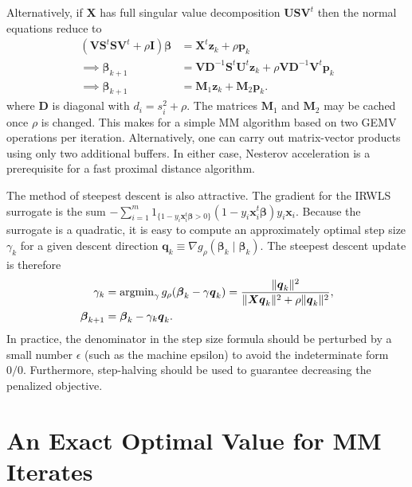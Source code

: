 \documentclass[11pt]{article}
\def\argmin{\mathop{\rm argmin}\nolimits}
\newcommand{\bp}{\boldsymbol{p}}
\newcommand{\bq}{\boldsymbol{q}}
\newcommand{\bx}{\boldsymbol{x}}
\newcommand{\bz}{\boldsymbol{z}}
\newcommand{\bD}{\boldsymbol{D}}
\newcommand{\bI}{\boldsymbol{I}}
\newcommand{\bM}{\boldsymbol{M}}
\newcommand{\bS}{\boldsymbol{S}}
\newcommand{\bU}{\boldsymbol{U}}
\newcommand{\bV}{\boldsymbol{V}}
\newcommand{\bX}{\boldsymbol{X}}
\newcommand{\bbeta}{\boldsymbol{\beta}}
\begin{document}
Alternatively, if $\bX$ has full singular value decomposition $\bU \bS \bV^{t}$ then the normal equations reduce to
\begin{equation}
\label{alg:MM}
\begin{aligned}
    (\bV \bS^{t} \bS \bV^{t} + \rho \bI) \bbeta &= \bX^{t} \bz_{k} + \rho \bp_{k} \\
    \implies \bbeta_{k+1} &= \bV \bD^{-1} \bS^{t} \bU^{t} \bz_{k}
    + \rho \bV \bD^{-1} \bV^{t} \bp_{k} \\
    \implies \bbeta_{k+1} &= \bM_{1} \bz_{k} + \bM_{2} \bp_{k}.
\end{aligned}
\end{equation}
where $\bD$ is diagonal with $d_{i} = s_{i}^{2} + \rho$.
The matrices $\bM_{1}$ and $\bM_{2}$ may be cached once $\rho$ is changed.
This makes for a simple MM algorithm based on two GEMV operations per iteration.
Alternatively, one can carry out matrix-vector products using only two additional buffers.
In either case, Nesterov acceleration is a prerequisite for a fast proximal distance algorithm.

The method of steepest descent is also attractive.
The gradient for the IRWLS surrogate is the sum $-\sum_{i=1}^m 1_{\{1-y_i\bx_i^t\bbeta > 0\}}(1-y_i\bx_i^t\bbeta)y_i\bx_i$.
Because the surrogate is a quadratic, it is easy to compute an approximately optimal step size $\gamma_{k}$ for a given descent direction $\bq_{k} \equiv \nabla g_{\rho}(\bbeta_{k} \mid \bbeta_{k})$.
The steepest descent update is therefore
\begin{equation}
\label{alg:SD}
\begin{aligned}
    \gamma_{k} &= \argmin_{\gamma} g_{\rho}(\bbeta_{k} - \gamma \bq_{k})
    = \frac{\|\bq_{k}\|^{2}}{\|\bX \bq_{k}\|^{2} + \rho \|\bq_{k}\|^{2}}, \\
    \bbeta_{k+1} &= \bbeta_{k} - \gamma_{k} \bq_{k}.
\end{aligned}
\end{equation}
In practice, the denominator in the step size formula should be perturbed by a small number $\epsilon$ (such as the machine epsilon) to avoid the indeterminate form $0 / 0$.
Furthermore, step-halving should be used to guarantee decreasing the penalized objective.

\section*{\center An Exact Optimal Value for MM Iterates}
\end{document}
